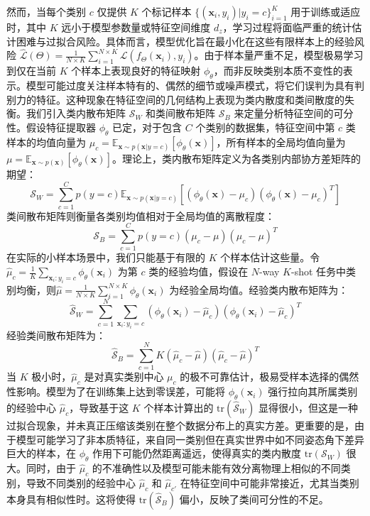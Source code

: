 然而，当每个类别 $c$ 仅提供 $K$ 个标记样本 $\{(\mathbf{x}_i, y_i) | y_i=c\}_{i=1}^K$ 用于训练或适应时，其中 $K$ 远小于模型参数量或特征空间维度 $d_z$，学习过程将面临严重的统计估计困难与过拟合风险。具体而言，模型优化旨在最小化在这些有限样本上的经验风险 $\hat{\mathcal{L}}(\Theta) = \frac{1}{N \times K} \sum_{i=1}^{N \times K} \mathcal{L}(f_\Theta(\mathbf{x}_i), y_i)$。由于样本量严重不足，模型极易学习到仅在当前 $K$ 个样本上表现良好的特征映射 $\phi_\theta$，而非反映类别本质不变性的表示。模型可能过度关注样本特有的、偶然的细节或噪声模式，将它们误判为具有判别力的特征。这种现象在特征空间的几何结构上表现为类内散度和类间散度的失衡。我们引入类内散布矩阵 $\mathcal{S}_W$ 和类间散布矩阵 $\mathcal{S}_B$ 来定量分析特征空间的可分性。假设特征提取器 $\phi_\theta$ 已定，对于包含 $C$ 个类别的数据集，特征空间中第 $c$ 类样本的均值向量为 $\mu_c = \mathbb{E}_{\mathbf{x} \sim p(\mathbf{x}|y=c)}[\phi_\theta(\mathbf{x})]$，所有样本的全局均值向量为 $\mu = \mathbb{E}_{\mathbf{x} \sim p(\mathbf{x})}[\phi_\theta(\mathbf{x})]$。理论上，类内散布矩阵定义为各类别内部协方差矩阵的期望：
\begin{equation}
    \mathcal{S}_W = \sum_{c=1}^{C} p(y=c) \mathbb{E}_{\mathbf{x} \sim p(\mathbf{x}|y=c)} [(\phi_\theta(\mathbf{x}) - \mu_c)(\phi_\theta(\mathbf{x}) - \mu_c)^T]
\end{equation}
类间散布矩阵则衡量各类别均值相对于全局均值的离散程度：
\begin{equation}
    \mathcal{S}_B = \sum_{c=1}^{C} p(y=c) (\mu_c - \mu)(\mu_c - \mu)^T
\end{equation}
在实际的小样本场景中，我们只能基于有限的 $K$ 个样本估计这些量。令 $\hat{\mu}_c = \frac{1}{K} \sum_{\mathbf{x}_i: y_i=c} \phi_\theta(\mathbf{x}_i)$ 为第 $c$ 类的经验均值，假设在 $N$-way $K$-shot 任务中类别均衡，则$\hat{\mu} = \frac{1}{N \times K} \sum_{i=1}^{N \times K} \phi_\theta(\mathbf{x}_i)$ 为经验全局均值。经验类内散布矩阵为：
\begin{equation}
    \hat{\mathcal{S}}_W = \sum_{c=1}^{N} \sum_{\mathbf{x}_i: y_i=c} (\phi_\theta(\mathbf{x}_i) - \hat{\mu}_c)(\phi_\theta(\mathbf{x}_i) - \hat{\mu}_c)^T
\end{equation}
经验类间散布矩阵为：
\begin{equation}
    \hat{\mathcal{S}}_B = \sum_{c=1}^{N} K (\hat{\mu}_c - \hat{\mu})(\hat{\mu}_c - \hat{\mu})^T
\end{equation}
当 $K$ 极小时，$\hat{\mu}_c$ 是对真实类别中心 $\mu_c$ 的极不可靠估计，极易受样本选择的偶然性影响。模型为了在训练集上达到零误差，可能将 $\phi_\theta(\mathbf{x}_i)$ 强行拉向其所属类别的经验中心 $\hat{\mu}_c$，导致基于这 $K$ 个样本计算出的 $\text{tr}(\hat{\mathcal{S}}_W)$ 显得很小，但这是一种过拟合现象，并未真正压缩该类别在整个数据分布上的真实方差。更重要的是，由于模型可能学习了非本质特征，来自同一类别但在真实世界中如不同姿态角下差异巨大的样本，在 $\phi_\theta$ 作用下可能仍然距离遥远，使得真实的类内散度 $\text{tr}(\mathcal{S}_W)$ 很大。同时，由于 $\hat{\mu}_c$ 的不准确性以及模型可能未能有效分离物理上相似的不同类别，导致不同类别的经验中心 $\hat{\mu}_c$ 和 $\hat{\mu}_{c'}$ 在特征空间中可能非常接近，尤其当类别本身具有相似性时。这将使得 $\text{tr}(\hat{\mathcal{S}}_B)$ 偏小，反映了类间可分性的不足。

